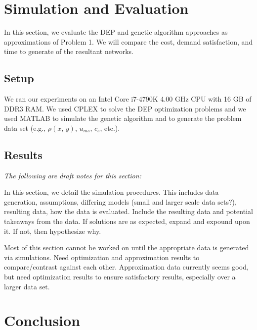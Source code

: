\documentclass[onecolumn,draftcls]{IEEEtran}
\begin{document}
\section{Simulation and Evaluation} \label{sim}
In this section, we evaluate the DEP and genetic algorithm approaches as approximations of Problem 1.  We will compare the cost, demand satisfaction, and time to generate of the resultant networks.

\subsection{Setup} \label{setup}



We ran our experiments on an Intel Core i7-4790K 4.00 GHz CPU with 16 GB of DDR3 RAM.  We used CPLEX \iffalse\textcolor{blue}{\textit{(Mohammad provides a citation for what CPLEX is here, should I?)}}\fi to solve the DEP optimization problems and we used MATLAB \iffalse\textcolor{blue}{\textit{(then should I cite MATLAB here, as well?)}}\fi to simulate the genetic algorithm and to generate the problem data set (e.g., $\rho\left(x,\, y\right)$, $u_{ms}$, $c_s$, etc.).

\subsection{Results} \label{results}

\noindent {\color{red} \rule{\linewidth}{0.5mm}}

\textit{The following are draft notes for this section:}

In this section, we detail the simulation procedures.  This includes data generation, assumptions, differing models (small and larger scale data sets?), resulting data, how the data is evaluated.  Include the resulting data and potential takeaways from the data.  If solutions are as expected, expand and expound upon it.  If not, then hypothesize why.

Most of this section cannot be worked on until the appropriate data is generated via simulations.  Need optimization and approximation results to compare/contrast against each other.  Approximation data currently seems good, but need optimization results to ensure satisfactory results, especially over a larger data set.

\section{Conclusion} \label{conclusion}
\end{document}
